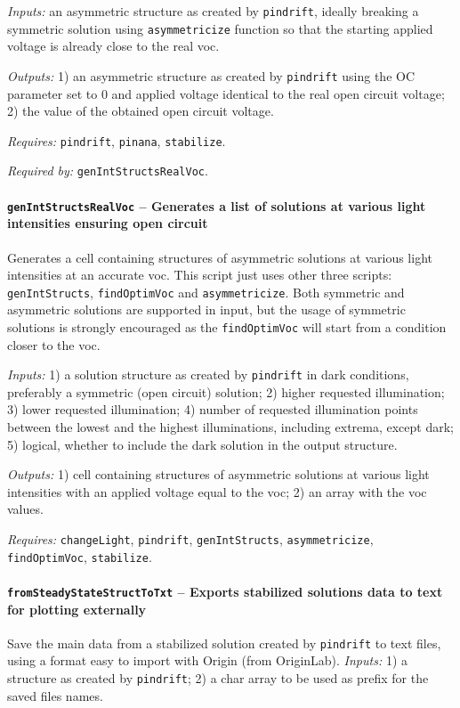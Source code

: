 		\textit{Inputs:} an asymmetric structure as created by \texttt{pin\-drift}, ideally
    breaking a symmetric solution using \texttt{asymmetricize} function so that
    the starting applied voltage is already close to the real \gls{voc}.
    
\textit{Outputs:} 1) an asymmetric structure as created by \texttt{pin\-drift} using the OC
     parameter set to 0 and applied voltage identical to the real open
     circuit voltage;
2) the value of the obtained open circuit voltage.

\textit{Requires:} \texttt{pin\-drift}, \texttt{pinana}, \texttt{stabilize}.

\textit{Required by:} \texttt{gen\-Int\-Structs\-Real\-Voc}.

		\paragraph{\texttt{gen\-Int\-Structs\-Real\-Voc} -- Generates a list of solutions at various light intensities ensuring open circuit}
		Generates a cell containing structures of asymmetric solutions at various light intensities at an accurate \gls{voc}.
		This script just uses other three scripts: \texttt{gen\-Int\-Structs}, \texttt{find\-Optim\-Voc}
		 and \texttt{asymmetricize}. Both symmetric and asymmetric solutions are supported in input, but the usage of symmetric solutions is strongly encouraged as the \texttt{find\-Optim\-Voc} will start from a condition closer to the \gls{voc}.
		
				\textit{Inputs:} 1) a solution structure as created by \texttt{pin\-drift} in dark
				     conditions, preferably a symmetric (open circuit) solution;
				2) higher requested illumination;
				3) lower requested illumination;
				4) number of requested illumination points between the lowest and the highest illuminations, including extrema, except dark;
				5) logical, whether to include the dark solution in the output
				     structure.
				
		\textit{Outputs:} 1) cell containing structures of asymmetric solutions at various light
		     intensities with an applied voltage equal to the \gls{voc};
		2) an array with the \gls{voc} values.
		
		\textit{Requires:} \texttt{change\-Light}, \texttt{pin\-drift}, \texttt{gen\-Int\-Structs},
		   \texttt{asymmetricize}, \texttt{find\-Optim\-Voc}, \texttt{stabilize}.
		   
		
		\paragraph{\texttt{from\-Steady\-State\-Struct\-To\-Txt} -- Exports stabilized solutions data to text for plotting externally}
		Save the main data from a stabilized solution created by \texttt{pin\-drift} to text files, using a format easy to import with Origin (from OriginLab).
				\textit{Inputs:} 1) a structure as created by \texttt{pin\-drift};
				2) a char array to be used as prefix for the saved files names.

